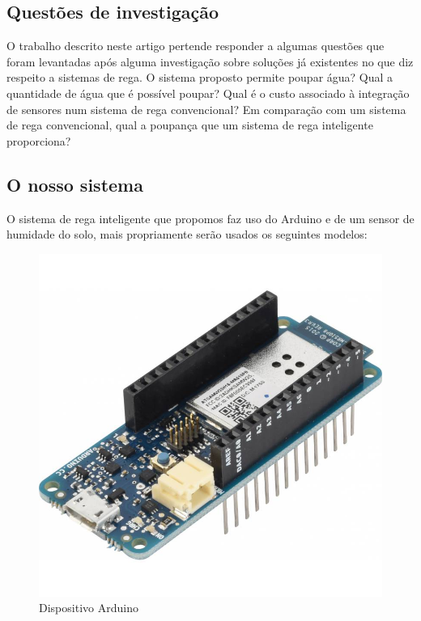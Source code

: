 \documentclass[conference]{IEEEtran}
\begin{document}
\subsection{Questões de investigação}
O trabalho descrito neste artigo pertende responder a algumas questões que foram 
levantadas após alguma investigação sobre soluções já existentes no que diz respeito 
a sistemas de rega. O sistema proposto permite poupar água? Qual a quantidade de água 
que é possível poupar?  Qual é o custo associado à integração de sensores num sistema 
de rega convencional? Em comparação com um sistema de rega convencional, 
qual a poupança que um sistema de rega inteligente proporciona?



\subsection{O nosso sistema}
O sistema de rega inteligente que propomos faz uso do Arduino e de um sensor de 
humidade do solo, mais propriamente serão usados os seguintes modelos:

\begin{figure}
    \includegraphics[scale=0.2]{arduino.jpg}
    \caption{Dispositivo Arduino}
    \label{fig:my_label1}
\end{figure}
\end{document}
